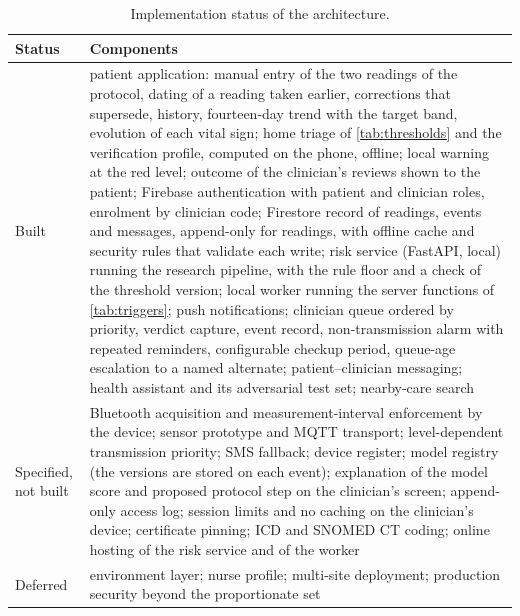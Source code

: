 \begin{table}[htbp]
\centering\footnotesize
\caption{Implementation status of the architecture.}\label{tab:build-status}
\begin{tabularx}{\textwidth}{@{}>{\raggedright\arraybackslash}p{3.0cm} X@{}}
\toprule
\textbf{Status} & \textbf{Components} \\
\midrule
Built & patient application: manual entry of the two readings of the protocol, dating of a reading taken earlier, corrections that supersede, history, fourteen-day trend with the target band, evolution of each vital sign; home triage of \cref{tab:thresholds} and the verification profile, computed on the phone, offline; local warning at the red level; outcome of the clinician's reviews shown to the patient; Firebase authentication with patient and clinician roles, enrolment by clinician code; Firestore record of readings, events and messages, append-only for readings, with offline cache and security rules that validate each write; risk service (FastAPI, local) running the research pipeline, with the rule floor and a check of the threshold version; local worker running the server functions of \cref{tab:triggers}; push notifications; clinician queue ordered by priority, verdict capture, event record, non-transmission alarm with repeated reminders, configurable checkup period, queue-age escalation to a named alternate; patient--clinician messaging; health assistant and its adversarial test set; nearby-care search \\
Specified, not built & Bluetooth acquisition and measurement-interval enforcement by the device; sensor prototype and MQTT transport; level-dependent transmission priority; SMS fallback; device register; model registry (the versions are stored on each event); explanation of the model score and proposed protocol step on the clinician's screen; append-only access log; session limits and no caching on the clinician's device; certificate pinning; ICD and SNOMED CT coding; online hosting of the risk service and of the worker \\
Deferred & environment layer; nurse profile; multi-site deployment; production security beyond the proportionate set \\
\bottomrule
\end{tabularx}
\end{table}


